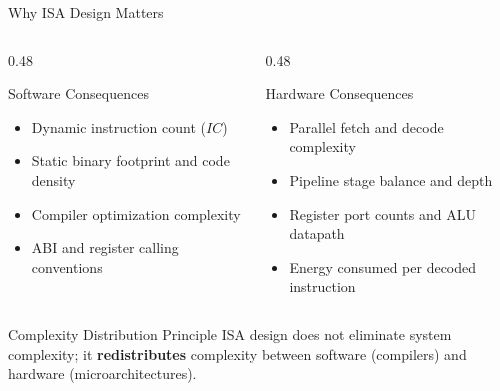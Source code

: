 \documentclass[aspectratio=169,11pt,t]{beamer}
\newcommand{\key}[1]{\textbf{#1}}
\begin{document}
\begin{frame}{Why ISA Design Matters}
\begin{columns}[T,onlytextwidth]
\begin{column}{0.48\textwidth}
\begin{block}{Software Consequences}
\begin{itemize}\setlength{\itemsep}{4pt}
  \item Dynamic instruction count ($\mathit{IC}$)
  \item Static binary footprint and code density
  \item Compiler optimization complexity
  \item ABI and register calling conventions
\end{itemize}
\end{block}
\end{column}

\begin{column}{0.48\textwidth}
\begin{block}{Hardware Consequences}
\begin{itemize}\setlength{\itemsep}{4pt}
  \item Parallel fetch and decode complexity
  \item Pipeline stage balance and depth
  \item Register port counts and ALU datapath
  \item Energy consumed per decoded instruction
\end{itemize}
\end{block}
\end{column}
\end{columns}

\vspace{0.4cm}
\normalsize
\begin{block}{Complexity Distribution Principle}
ISA design does not eliminate system complexity; it \key{redistributes} complexity between software (compilers) and hardware (microarchitectures).
\end{block}
\end{frame}

\end{document}
